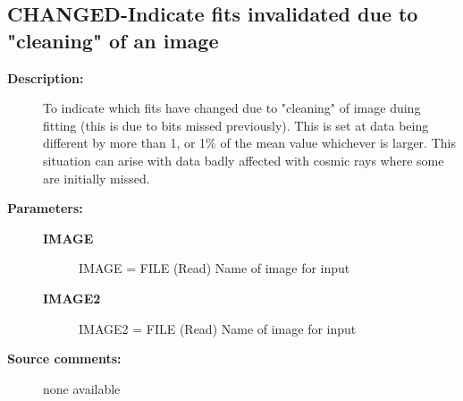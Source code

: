 \subsection{CHANGED-\label{CHANGED}Indicate fits invalidated due to "cleaning" of an image}
\begin{description}

\item [\textbf{Description:}]
  To indicate which fits have changed due to "cleaning" of image duing
  fitting (this is due to bits missed previously). This is set at data
  being different by more than 1, or 1\% of the mean value whichever is
  larger. This situation can arise with data badly affected with cosmic
  rays where some are initially missed.

\item [\textbf{Parameters:}]
\begin{description}
\item [\textbf{IMAGE}]
    IMAGE = FILE (Read)
        Name of image for input
\item [\textbf{IMAGE2}]
    IMAGE2 = FILE (Read)
        Name of image for input
\end{description}

\item [\textbf{Source comments:}]
\begin{terminalv}
  none available

\end{terminalv}
\end{description}

